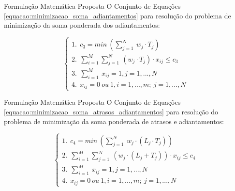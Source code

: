 \documentclass[]{beamer}
\begin{document}
	\begin{frame}{Formulação Matemática Proposta}	
		O Conjunto de Equações \ref{equacao:minimizacao_soma_adiantamentos} para
    resolução do problema de minimização da soma ponderada dos adiantamentos: 


		\begin{equation}\label{equacao:minimizacao_soma_adiantamentos}
			\begin{cases}
			1. \ \ c_{3} = min \ (\sum_{j=1}^N \ w_{j}   \cdot T_{j} ) \\ 
			2. \ \ \sum_{i=1}^M  \sum_{j=1}^N  \ (w_{j} \cdot T_{j})  \cdot x_{ij} \leq c_{3} \\
			3. \ \ \sum_{i=1}^M  \ x_{ij} = 1,j = 1, ...,N \\
			4. \ \ x_{ij} = 0 \ ou \ 1,i = 1, ...,m;\ j = 1, ...,N
			\end{cases}
		\end{equation}

	\end{frame}

	\begin{frame}{Formulação Matemática Proposta}	
		O Conjunto de Equações \ref{equacao:minimizacao_soma_atrasos_adiantamentos} para
		resolução do problema de minimização da soma ponderada de atrasos e adiantamentos: 
	
	
		\begin{equation}\label{equacao:minimizacao_soma_atrasos_adiantamentos}
			\begin{cases}
				1.\ \  c_{4} = min \ (\sum_{j=1}^N \ w_{j}   \cdot (L_{j} \cdot T_{j}) ) \\ 
				2.\ \  \sum_{i=1}^M  \sum_{j=1}^N  \ (w_{j} \cdot (L_{j} + T_{j}))  \cdot x_{ij} \leq c_{4} \\
				3.\ \  \sum_{i=1}^M  \ x_{ij} = 1,j = 1, ...,N \\
				4.\ \  x_{ij} = 0 \ ou \ 1,i = 1, ...,m;\ j = 1, ...,N
			\end{cases}
		\end{equation}
	\end{frame}
\end{document}
